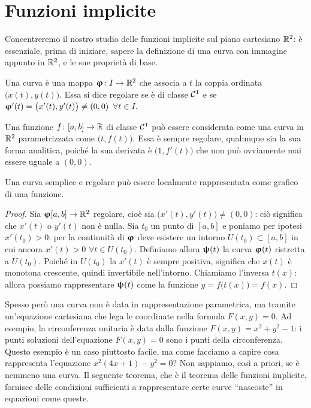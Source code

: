 \chapter{Funzioni implicite}
Concentreremo il nostro studio delle funzioni implicite sul piano cartesiano $\mathbb{R}^2$: è essenziale, prima di iniziare, sapere la definizione di una curva con immagine appunto in $\mathbb{R}^2$, e le sue proprietà di base.
\begin{definizione}
	Una curva è una mappa $\bm{\upvarphi}\colon I\to\mathbb{R}^2$ che associa a $t$ la coppia ordinata $\big(x(t),y(t)\big)$.
	Essa si dice regolare se è di classe $\mathcal{C}^{{1}}$ e se $\bm{\upvarphi}'(t)=\big(x'(t),y'(t)\big)\neq(0,0)$ $\forall t\in I$.
\end{definizione}
Una funzione $f\colon[a,b]\to\mathbb{R}$ di classe $\mathcal{C}^{{1}}$ può essere considerata come una curva in $\mathbb{R}^2$ parametrizzata come $\big(t,f(t)\big)$.
Essa è sempre regolare, qualunque sia la sua forma analitica, poiché la sua derivata è $\big(1,f'(t)\big)$ che non può ovviamente mai essere uguale a $(0,0)$.
\begin{osservazione}
	Una curva semplice e regolare può essere localmente rappresentata come grafico di una funzione.
\end{osservazione}
\begin{proof}
	Sia $\bm{\upvarphi}[a,b]\to\mathbb{R}^2$ regolare, cioè sia $\big(x'(t),y'(t)\big)\neq(0,0)$: ciò significa che $x'(t)$ o $y'(t)$ non è nulla.
	Sia $t_0$ un punto di $[a,b]$ e poniamo per ipotesi $x'(t_0)>0$: per la continuità di $\bm{\upvarphi}$ deve esistere un intorno $U(t_0)\subset[a,b]$ in cui ancora $x'(t)>0$ $\forall t\in U(t_0)$.
	Definiamo allora $\bm{\uppsi}(t)$ la curva $\bm{\upvarphi}(t)$ ristretta a $U(t_0)$.
	Poiché in $U(t_0)$ la $x'(t)$ è sempre positiva, significa che $x(t)$ è monotona crescente, quindi invertibile nell'intorno.
	Chiamiamo l'inversa $t(x)$: allora possiamo rappresentare $\bm{\uppsi}(t)$ come la funzione $y=f\big(t(x)\big)=f(x)$.
\end{proof}
Spesso però una curva non è data in rappresentazione parametrica, ma tramite un'equazione cartesiana che lega le coordinate nella formula $F(x,y)=0$.
Ad esempio, la circonferenza unitaria è data dalla funzione $F(x,y)=x^2+y^2-1$: i punti soluzioni dell'equazione $F(x,y)=0$ sono i punti della circonferenza.
Questo esempio è un caso piuttosto facile, ma come facciamo a capire cosa rappresenta l'equazione $x^2(4x+1)-y^2=0$?
Non sappiamo, così a priori, se è nemmeno una curva.
Il seguente teorema, che è il teorema delle funzioni implicite, fornisce delle condizioni sufficienti a rappresentare certe curve ``nascoste'' in equazioni come queste.
